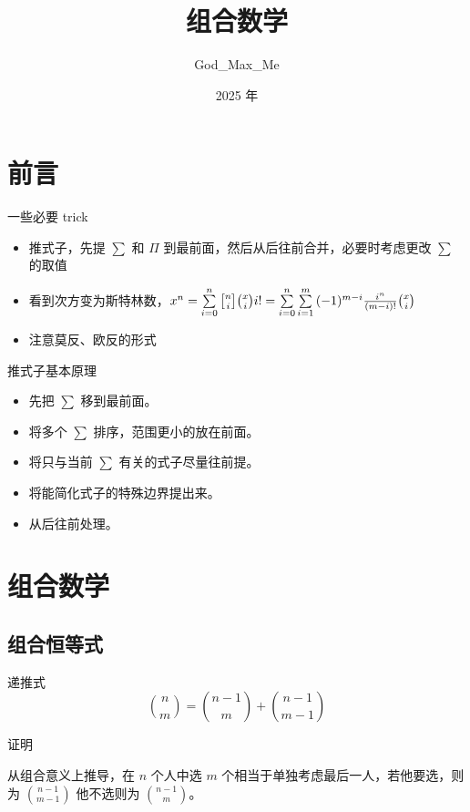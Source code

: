 \documentclass[UTF8]{beamer}
\title{组合数学}
\author{God\_Max\_Me}
\institute{Chengdu No.7 High School.}
\date{2025 年}
\begin{document}
  \maketitle
  \section{前言}

  \begin{frame}{一些必要 trick}
    \begin{itemize}
      \item
        推式子，先提 $\sum$ 和 $\Pi$
        到最前面，然后从后往前合并，必要时考虑更改 $\sum$ 的取值
      \item
        看到次方变为斯特林数，$x^n=\sum\limits_{i=0}^{n} {n \brack i} {x \choose i}i!=\sum\limits_{i=0}^{n}\sum\limits_{i=1}^m{(-1)^{m-i}{i^n \over (m-i)!}}{x \choose i}$
      \item
        注意莫反、欧反的形式
    \end{itemize}
  \end{frame}

  \begin{frame}{推式子基本原理}
    \begin{itemize}
      \item
        先把 $\sum$ 移到最前面。
      \item
        将多个 $\sum$ 排序，范围更小的放在前面。
      \item
        将只与当前 $\sum$ 有关的式子尽量往前提。
      \item
        将能简化式子的特殊边界提出来。
      \item
        从后往前处理。
    \end{itemize}
  \end{frame}
  
  \section{组合数学}
  \subsection{组合恒等式}

  \begin{frame}
    \begin{block}{递推式}
      $$
      {n \choose m}={n-1 \choose m}+{n-1 \choose m-1}
      $$
    \end{block}
    
    \pause
    证明

    从组合意义上推导，在 $n$ 个人中选 $m$
    个相当于单独考虑最后一人，若他要选，则为 ${n-1 \choose m-1}$ 他不选则为
    ${n-1 \choose m}$。
  \end{frame}
  
\end{document}
